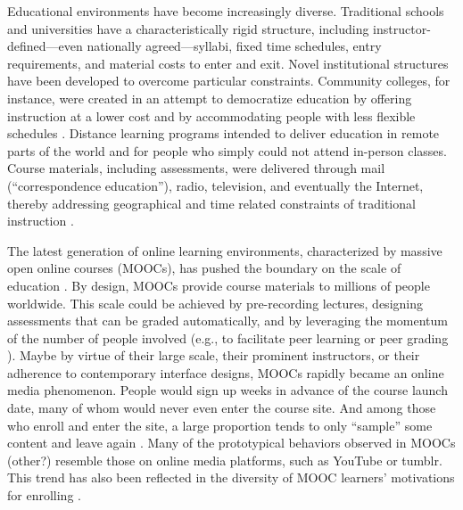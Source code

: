 \documentclass{sigchi}\usepackage[]{graphicx}\usepackage[]{color}
\begin{document}
Educational environments have become increasingly diverse. Traditional schools and universities have a characteristically rigid structure, including instructor-defined---even nationally agreed---syllabi, fixed time schedules, entry requirements, and material costs to enter and exit. Novel institutional structures have been developed to overcome particular constraints. Community colleges, for instance, were created in an attempt to democratize education by offering instruction at a lower cost and by accommodating people with less flexible schedules \cite{goldrick2010challenges}. Distance learning programs intended to deliver education in remote parts of the world and for people who simply could not attend in-person classes. Course materials, including assessments, were delivered through mail (``correspondence education''), radio, television, and eventually the Internet, thereby addressing geographical and time related constraints of traditional instruction \cite{moore1996distance}.

The latest generation of online learning environments, characterized by massive open online courses (MOOCs), has pushed the boundary on the scale of education \cite{waldrop2013campus}. By design, MOOCs provide course materials to millions of people worldwide. This scale could be achieved by pre-recording lectures, designing assessments that can be graded automatically, and by leveraging the momentum of the number of people involved (e.g., to facilitate peer learning or peer grading \cite{kulkarni2013peer,cambre2014talkabout}). Maybe by virtue of their large scale, their prominent instructors, or their adherence to contemporary interface designs, MOOCs rapidly became an online media phenomenon. People would sign up weeks in advance of the course launch date, many of whom would never even enter the course site. And among those who enroll and enter the site, a large proportion tends to only ``sample'' some content and leave again \cite{kizilcec2013deconstructing}. Many of the prototypical behaviors observed in MOOCs \cite{kizilcec2013deconstructing,breslow2013studying} (other?) resemble those on online media platforms, such as YouTube or tumblr. This trend has also been reflected in the diversity of MOOC learners' motivations for enrolling \cite{kizilcec2015motivation}.
\end{document}
